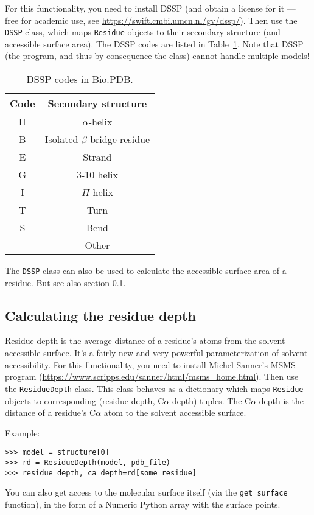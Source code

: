 For this functionality, you need to install DSSP (and obtain a license
for it --- free for academic use, see \url{https://swift.cmbi.umcn.nl/gv/dssp/}).
Then use the \texttt{DSSP} class, which maps \texttt{Residue} objects
to their secondary structure (and accessible surface area). The DSSP
codes are listed in Table~\ref{table:DSSP-codes}. Note that DSSP (the
program, and thus by consequence the class) cannot handle multiple
models!

\begin{table}
\begin{tabular}{|c|c|}
\hline
Code&
Secondary structure \\
\hline
\hline
H&
$\alpha$-helix \\
\hline
B&
Isolated $\beta$-bridge residue \\
\hline
E&
Strand \\
\hline
G&
3-10 helix \\
\hline
I&
$\Pi$-helix \\
\hline
T&
Turn\\
\hline
S&
Bend \\
\hline
-&
Other\\
\hline
\end{tabular}
\caption{DSSP codes in Bio.PDB.}
\label{table:DSSP-codes}
\end{table}

The \texttt{DSSP} class can also be used to calculate the accessible surface area of a residue. But see also section \ref{sec:residue_depth}.

\subsection{Calculating the residue depth}
\label{sec:residue_depth}

Residue depth is the average distance of a residue's atoms from the
solvent accessible surface. It's a fairly new and very powerful parameterization
of solvent accessibility. For this functionality, you need to install
Michel Sanner's MSMS program (\url{https://www.scripps.edu/sanner/html/msms_home.html}).
Then use the \texttt{ResidueDepth} class. This class behaves as a
dictionary which maps \texttt{Residue} objects to corresponding (residue
depth, C$\alpha$ depth) tuples. The C$\alpha$ depth is the distance
of a residue's C$\alpha$ atom to the solvent accessible surface.

Example:

\begin{verbatim}
>>> model = structure[0]
>>> rd = ResidueDepth(model, pdb_file)
>>> residue_depth, ca_depth=rd[some_residue]
\end{verbatim}
You can also get access to the molecular surface itself (via the \texttt{get\_surface}
function), in the form of a Numeric Python array with the surface points.

